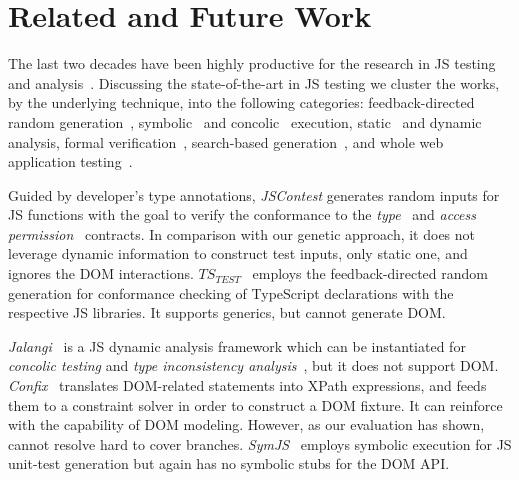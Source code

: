 \section{Related and Future Work}
\label{sec:related.work}

The last two decades have been highly productive for the research in JS testing and analysis~\cite{andreasen2017survey, sun2017analysis, mesbah2015advances}. Discussing the state-of-the-art in JS testing we cluster the works, by the underlying technique, into the following categories: feedback-directed random generation~\cite{heidegger2010contract,heidegger2012jscontest,kristensen2017type}, symbolic~\cite{tanida2014automatic,saxena2010symbolic} and concolic~\cite{sen2013jalangi,amin:ase15} execution, static~\cite{tajs2009,dom2011} and dynamic~\cite{andreasen2017survey} analysis, formal verification~\cite{gardner2008local,lerner2012modeling,gardner2012towards}, search-based generation~\cite{alshraideh2008complete}, and whole web application testing~\cite{alshahwan2011automated,mesbah2012invariant,milani2014leveraging}.

Guided by developer's type annotations, \emph{JSContest} generates random inputs for JS functions with the goal to verify the conformance to the \emph{type}~\cite{heidegger2010contract} and \emph{access permission}~\cite{heidegger2012jscontest} contracts. In comparison with our genetic approach, it does not leverage dynamic information to construct test inputs, only static one, and ignores the DOM interactions. $TS_{TEST}$~\cite{kristensen2017type} employs the feedback-directed random generation for conformance checking of TypeScript declarations with the respective JS libraries. It supports generics, but cannot generate DOM.


\emph{Jalangi}~\cite{sen2013jalangi} is a JS dynamic analysis framework which can be instantiated for \emph{concolic testing} and \emph{type inconsistency analysis}~\cite{pradel2015typedevil}, but it does not support DOM. \emph{Confix}~\cite{amin:ase15} translates DOM-related statements into XPath expressions, and feeds them to a constraint solver in order to construct a DOM fixture. It can reinforce \Jalangi with the capability of DOM modeling. However, as our evaluation has shown, \Confix cannot resolve hard to cover branches. \emph{SymJS}~\cite{tanida2014automatic} employs symbolic execution for JS unit-test generation but again has no symbolic stubs for the DOM API.

